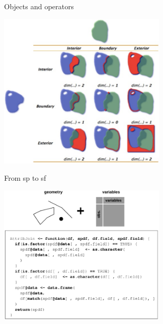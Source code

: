 \begin{frame}{Objects and operators}
\begin{center}
\includegraphics[width=8cm]{DE_9IM_bis.png}
\end{center}
\end{frame}



\begin{frame}{From sp to sf}
\begin{center}
\includegraphics[width=8cm]{VectRast.pdf}
\end{center}
\end{frame}


